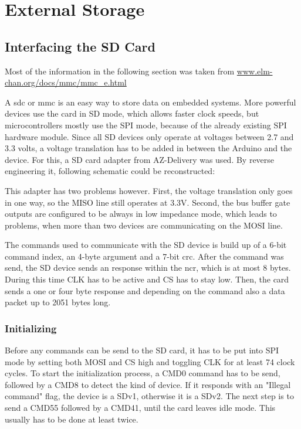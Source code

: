 \setchapterpreamble[u]{\margintoc}

\chapter{External Storage}

\section{Interfacing the SD Card}
\label{sec:interfacing-the-sd-card}

Most of the information in the following section was taken from \href{http://www.elm-chan.org/docs/mmc/mmc_e.html}{www.elm-chan.org/docs/mmc/mmc\_e.html}

A \gls{sdc} or \gls{mmc} is an easy way to store data on embedded systems. More powerful devices use the card in SD mode, which allows faster clock speeds, but microcontrollers mostly use the SPI mode, because of the already existing SPI hardware module. Since all SD devices only operate at voltages between 2.7 and 3.3 volts, a voltage translation has to be added in between the Arduino and the device. For this, a SD card adapter from AZ-Delivery was used. By reverse engineering it, following schematic could be reconstructed:


This adapter has two problems however. First, the voltage translation only goes in one way, so the MISO line still operates at 3.3V. Second, the bus buffer gate outputs are configured to be always in low impedance mode, which leads to problems, when more than two devices are communicating on the MOSI line.

The commands used to communicate with the SD device is build up of a 6-bit command index, an 4-byte argument and a 7-bit \gls{crc}. After the command was send, the SD device sends an response within the \gls{ncr}, which is at most 8 bytes. During this time CLK has to be active and CS has to stay low. Then, the card sends a one or four byte response and depending on the command also a data packet up to 2051 bytes long.

\subsection{Initializing}
\label{sec:initializing}

Before any commands can be send to the SD card, it has to be put into SPI mode by setting both MOSI and CS high and toggling CLK for at least 74 clock cycles. To start the initialization process, a CMD0 command has to be send, followed by a CMD8 to detect the kind of device. If it responds with an "Illegal command" flag, the device is a SDv1, otherwise it is a SDv2. The next step is to send a CMD55 followed by a CMD41, until the card leaves idle mode. This usually has to be done at least twice. 

